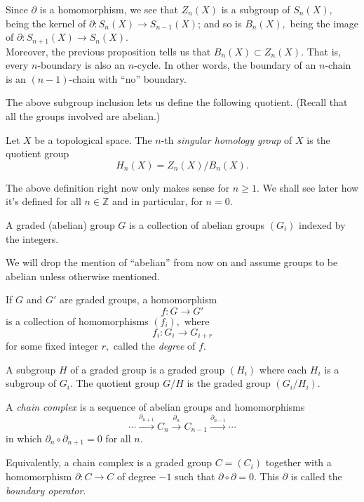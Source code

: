 \documentclass[12pt]{article}
\begin{document}
Since $\partial$ is a homomorphism, we see that $Z_n(X)$ is a subgroup of $S_n(X),$ being the kernel of $\partial:S_{n}(X) \to S_{n-1}(X)$; and so is $B_{n}(X),$ being the image of $\partial:S_{n+1}(X) \to S_n(X).$ \\
Moreover, the previous proposition tells us that $B_n(X) \subset Z_n(X).$ That is, every $n$-boundary is also an $n$-cycle. In other words, the boundary of an $n$-chain is an $(n-1)$-chain with ``no'' boundary.

The above subgroup inclusion lets us define the following quotient. (Recall that all the groups involved are abelian.)

\begin{defn}
	Let $X$ be a topological space. The $n$-th \emph{singular homology group} of $X$ is the quotient group
	\begin{equation*} 
		H_n(X) = Z_n(X)/B_n(X).
	\end{equation*}
\end{defn}

The above definition right now only makes sense for $n \ge 1.$ We shall see later how it's defined for all $n \in \mathbb{Z}$ and in particular, for $n = 0.$

\begin{defn}
	A graded (abelian) group $G$ is a collection of abelian groups $(G_i)$ indexed by the integers.
\end{defn}

We will drop the mention of ``abelian'' from now on and assume groups to be abelian unless otherwise mentioned.

\begin{defn}[Homomorphisms]
	If $G$ and $G'$ are graded groups, a homomorphism
	\begin{equation*} 
		f:G\to G'
	\end{equation*}
	is a collection of homomorphisms $(f_i),$ where 
	\begin{equation*} 
		f_i : G_i \to G_{i+r}
	\end{equation*}
	for some fixed integer $r,$ called the \emph{degree} of $f.$
\end{defn}

A subgroup $H$ of a graded group is a graded group $(H_i)$ where each $H_i$ is a subgroup of $G_i.$ The quotient group $G/H$ is the graded group $(G_i/H_i).$

\begin{defn}
	A \emph{chain complex} is a sequence of abelian groups and homomorphisms
	\begin{equation*} 
		\cdots \overset{\partial_{n+1}}{\longrightarrow} C_n \overset{\partial_n}{\longrightarrow} C_{n-1} \overset{\partial_{n-1}}{\longrightarrow} \cdots
	\end{equation*}	
	in which $\partial_{n}\circ\partial_{n+1} = 0$ for all $n.$
\end{defn}
Equivalently, a chain complex is a graded group $C = (C_i)$ together with a homomorphism $\partial:C \to C$ of degree $-1$ such that $\partial\circ\partial = 0.$ This $\partial$ is called the \emph{boundary operator}.
\end{document}
